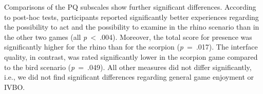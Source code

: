\documentclass{sigchi}
\begin{document}
Comparisons of the PQ subscales show further significant differences. According to post-hoc tests, participants reported significantly better experiences regarding the possibility to act and the possibility to examine in the rhino scenario than in the other two games (all \textit{p}~<~.004). %
Moreover, the total score for presence was significantly higher for the rhino than for the scorpion (\textit{p}~=~.017). %
The interface quality, in contrast, was rated significantly lower in the scorpion game compared to the bird scenario (\textit{p}~=~.049). %
All other measures did not differ significantly, i.e., we did not find significant differences regarding general game enjoyment or IVBO.

\def\rot{\rotatebox}
\end{document}
